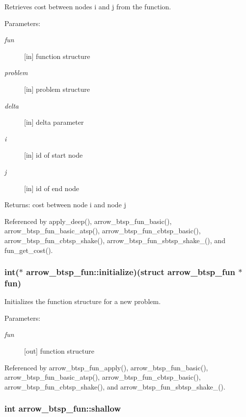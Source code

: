 Retrieves cost between nodes i and j from the function. 

\begin{Desc}
\item[Parameters:]
\begin{description}
\item[{\em fun}]\mbox{[}in\mbox{]} function structure \item[{\em problem}]\mbox{[}in\mbox{]} problem structure \item[{\em delta}]\mbox{[}in\mbox{]} delta parameter \item[{\em i}]\mbox{[}in\mbox{]} id of start node \item[{\em j}]\mbox{[}in\mbox{]} id of end node \end{description}
\end{Desc}
\begin{Desc}
\item[Returns:]cost between node i and node j \end{Desc}


Referenced by apply\_\-deep(), arrow\_\-btsp\_\-fun\_\-basic(), arrow\_\-btsp\_\-fun\_\-basic\_\-atsp(), arrow\_\-btsp\_\-fun\_\-cbtsp\_\-basic(), arrow\_\-btsp\_\-fun\_\-cbtsp\_\-shake(), arrow\_\-btsp\_\-fun\_\-sbtsp\_\-shake\_(), and fun\_\-get\_\-cost().\hypertarget{structarrow__btsp__fun_c588686921bd526653a7e0d7816aee44}{
\subsubsection[{initialize}]{\setlength{\rightskip}{0pt plus 5cm}int($\ast$ {\bf arrow\_\-btsp\_\-fun::initialize})(struct {\bf arrow\_\-btsp\_\-fun} $\ast$fun)}}
\label{structarrow__btsp__fun_c588686921bd526653a7e0d7816aee44}


Initializes the function structure for a new problem. 

\begin{Desc}
\item[Parameters:]
\begin{description}
\item[{\em fun}]\mbox{[}out\mbox{]} function structure \end{description}
\end{Desc}


Referenced by arrow\_\-btsp\_\-fun\_\-apply(), arrow\_\-btsp\_\-fun\_\-basic(), arrow\_\-btsp\_\-fun\_\-basic\_\-atsp(), arrow\_\-btsp\_\-fun\_\-cbtsp\_\-basic(), arrow\_\-btsp\_\-fun\_\-cbtsp\_\-shake(), and arrow\_\-btsp\_\-fun\_\-sbtsp\_\-shake\_().\hypertarget{structarrow__btsp__fun_1950686e4862a4b1bd68d1ada85e2c79}{
\subsubsection[{shallow}]{\setlength{\rightskip}{0pt plus 5cm}int {\bf arrow\_\-btsp\_\-fun::shallow}}}
\label{structarrow__btsp__fun_1950686e4862a4b1bd68d1ada85e2c79}


